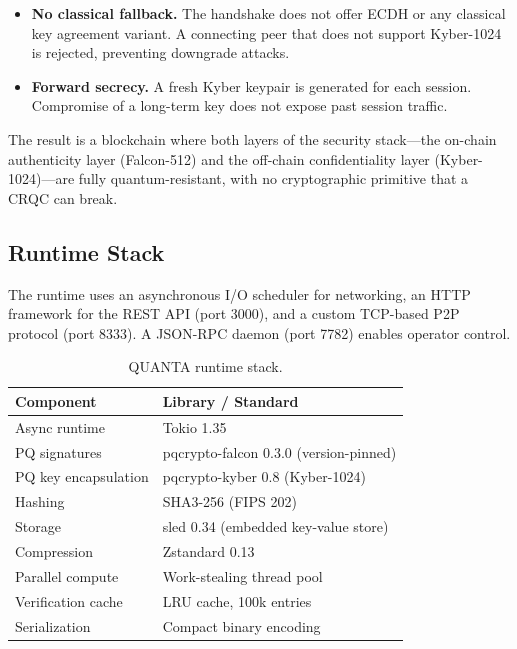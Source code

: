 \documentclass[11pt,a4paper]{article}
\begin{document}
\begin{itemize}
  \item \textbf{No classical fallback.} The handshake does not offer
        ECDH or any classical key agreement variant. A connecting peer that
        does not support Kyber-1024 is rejected, preventing downgrade attacks.
  \item \textbf{Forward secrecy.} A fresh Kyber keypair is generated for
        each session. Compromise of a long-term key does not expose past
        session traffic.
\end{itemize}

The result is a blockchain where both layers of the security stack---the
on-chain authenticity layer (Falcon-512) and the off-chain confidentiality
layer (Kyber-1024)---are fully quantum-resistant, with no cryptographic
primitive that a CRQC can break.

\subsection{Runtime Stack}

The runtime uses an asynchronous I/O scheduler for networking, an HTTP
framework for the REST API (port 3000), and a custom TCP-based P2P protocol
(port 8333). A JSON-RPC daemon (port 7782) enables operator control.

\begin{table}[h]
\centering
\begin{tabular}{@{}ll@{}}
\toprule
\textbf{Component} & \textbf{Library / Standard} \\
\midrule
Async runtime       & Tokio 1.35 \\
PQ signatures       & pqcrypto-falcon 0.3.0 (version-pinned) \\
PQ key encapsulation & pqcrypto-kyber 0.8 (Kyber-1024) \\
Hashing             & SHA3-256 (FIPS 202) \\
Storage             & sled 0.34 (embedded key-value store) \\
Compression         & Zstandard 0.13 \\
Parallel compute    & Work-stealing thread pool \\
Verification cache  & LRU cache, 100k entries \\
Serialization       & Compact binary encoding \\
\bottomrule
\end{tabular}
\caption{QUANTA runtime stack.}
\end{table}
\end{document}
